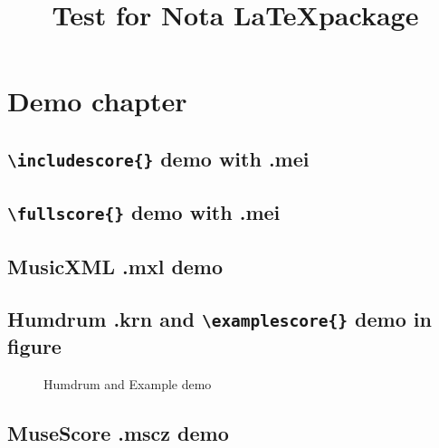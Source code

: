 \documentclass[
    a3paper,
    twoside
]{book}
\begin{document}
\title{Test for Nota \LaTeX package}
\maketitle

\tableofcontents

\chapter{Demo chapter}

\section{\texttt{\textbackslash includescore\{\}} demo with \textbf{.mei}}

    \blindtext[1]


    \blindtext[1]

\section{\texttt{\textbackslash fullscore\{\}} demo with \textbf{.mei}}

    \blindtext[1]


    \blindtext[1]

\section{MusicXML \textbf{.mxl} demo}

    \blindtext[1]


    \blindtext[1]

\section{Humdrum \textbf{.krn} and \texttt{\textbackslash examplescore\{\}} demo in figure}

    \blindtext[1]

    \begin{figure}[h!]
        \centering
        \caption{Humdrum and Example demo}
    \end{figure}

    \blindtext[1]

\section{MuseScore \textbf{.mscz} demo}

    \blindtext[1]


    \blindtext[1]
\end{document}
